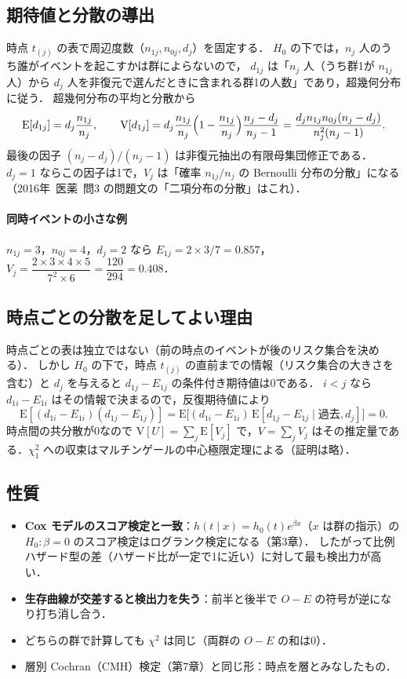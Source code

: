 \documentclass[a4paper,11pt,openany]{ltjsbook}
\newcommand{\kakomon}[2]{\mbox{#1年 医薬 問#2}}
\newcommand{\E}{\mathrm{E}}
\newcommand{\V}{\mathrm{V}}
\begin{document}
\subsection{期待値と分散の導出}
時点 $t_{(j)}$ の表で周辺度数（$n_{1j},n_{0j},d_j$）を固定する．
$H_0$ の下では，$n_j$ 人のうち誰がイベントを起こすかは群によらないので，
$d_{1j}$ は「$n_j$ 人（うち群1が $n_{1j}$ 人）から $d_j$ 人を非復元で選んだときに含まれる群1の人数」であり，超幾何分布に従う．
超幾何分布の平均と分散から
\[
\E[d_{1j}]=d_j\frac{n_{1j}}{n_j},\qquad \V[d_{1j}]=d_j\frac{n_{1j}}{n_j}\Bigl(1-\frac{n_{1j}}{n_j}\Bigr)\frac{n_j-d_j}{n_j-1}
=\frac{d_jn_{1j}n_{0j}(n_j-d_j)}{n_j^2(n_j-1)} .
\]
最後の因子 $(n_j-d_j)/(n_j-1)$ は非復元抽出の有限母集団修正である．
$d_j=1$ ならこの因子は1で，$V_j$ は「確率 $n_{1j}/n_j$ の Bernoulli 分布の分散」になる（\kakomon{2016}{3} の問題文の「二項分布の分散」はこれ）．
\paragraph{同時イベントの小さな例}
$n_{1j}=3$，$n_{0j}=4$，$d_j=2$ なら $E_{1j}=2\times3/7=0.857$，$V_j=\dfrac{2\times3\times4\times5}{7^2\times6}=\dfrac{120}{294}=0.408$．

\subsection{時点ごとの分散を足してよい理由}
時点ごとの表は独立ではない（前の時点のイベントが後のリスク集合を決める）．
しかし $H_0$ の下で，時点 $t_{(j)}$ の直前までの情報（リスク集合の大きさを含む）と $d_j$ を与えると $d_{1j}-E_{1j}$ の条件付き期待値は0である．
$i<j$ なら $d_{1i}-E_{1i}$ はその情報で決まるので，反復期待値により
\[
\E[(d_{1i}-E_{1i})(d_{1j}-E_{1j})]=\E\bigl[(d_{1i}-E_{1i})\,\E[d_{1j}-E_{1j}\mid\text{過去},d_j]\bigr]=0 .
\]
時点間の共分散が0なので $\V[U]=\sum_j\E[V_j]$ で，$V=\sum_jV_j$ はその推定量である．$\chi^2_1$ への収束はマルチンゲールの中心極限定理による（証明は略）．

\subsection{性質}
\begin{itemize}
\item \textbf{Cox モデルのスコア検定と一致}：$h(t\mid x)=h_0(t)e^{\beta x}$（$x$ は群の指示）の $H_0:\beta=0$ のスコア検定はログランク検定になる（第3章）．
      したがって比例ハザード型の差（ハザード比が一定で1に近い）に対して最も検出力が高い．
\item \textbf{生存曲線が交差すると検出力を失う}：前半と後半で $O-E$ の符号が逆になり打ち消し合う．
\item どちらの群で計算しても $\chi^2$ は同じ（両群の $O-E$ の和は0）．
\item 層別 Cochran（CMH）検定（第7章）と同じ形：時点を層とみなしたもの．
\end{itemize}
\end{document}
